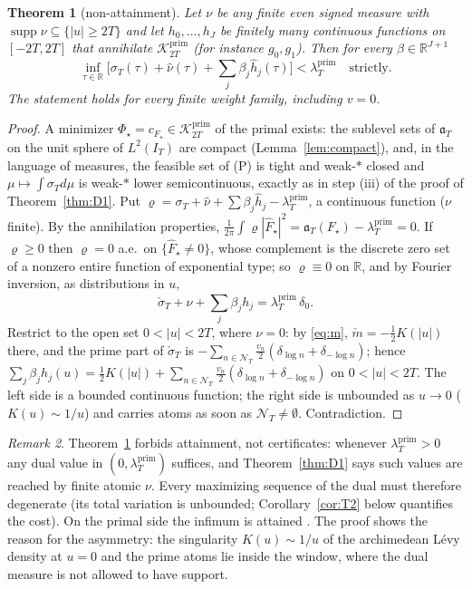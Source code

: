 \documentclass[11pt]{amsart}
\newtheorem{theorem}{Theorem}[section]
\theoremstyle{definition}
\theoremstyle{remark}
\newtheorem{remark}[theorem]{Remark}
\newcommand{\R}{\mathbb R}
\newcommand{\supp}{\operatorname{supp}}
\newcommand{\Kp}{\mathcal K^{\mathrm{prim}}_{2T}}
\newcommand{\IT}{I_T}
\newcommand{\lamP}{\lambda^{\mathrm{prim}}_T}
\newcommand{\sT}{\sigma_T}
\newcommand{\nuh}{\widehat\nu}
\newcommand{\Fh}{\widehat F}
\newcommand{\NT}{\mathcal N_T}
\begin{document}
\begin{theorem}[non-attainment]\label{thm:O}
Let $\nu$ be any finite even signed measure with $\supp\nu\subseteq\{|u|\ge2T\}$ and let
$h_0,\dots,h_J$ be finitely many continuous functions on $[-2T,2T]$ that annihilate $\Kp$
(for instance $g_0,g_1$). Then for every $\beta\in\R^{J+1}$
\[
\inf_{\tau\in\R}\Big[\sT(\tau)+\nuh(\tau)+\sum_j\beta_j\widehat h_j(\tau)\Big]<\lamP\quad\text{strictly.}
\]
The statement holds for every finite weight family, including $v=0$.
\end{theorem}
\begin{proof}
A minimizer $\Phi_\star=c_{F_\star}\in\Kp$ of the primal exists: the sublevel sets of
$\mathfrak a_T$ on the unit sphere of $L^2(\IT)$ are compact (Lemma~\ref{lem:compact}),
and, in the language of measures, the feasible set of (P) is tight and weak-$*$ closed and $\mu\mapsto\int\sT d\mu$ is
weak-$*$ lower semicontinuous, exactly as in step (iii) of the proof of Theorem~\ref{thm:D1}. Put $\varrho=\sT+\nuh+\sum\beta_j\widehat h_j-\lamP$, a
continuous function ($\nu$ finite). By the annihilation properties,
$\frac1{2\pi}\int\varrho|\Fh_\star|^2=\mathfrak a_T(F_\star)-\lamP=0$. If $\varrho\ge0$ then $\varrho=0$ a.e.\ on
$\{\Fh_\star\ne0\}$, whose complement is the discrete zero set of a nonzero entire function of
exponential type; so $\varrho\equiv0$ on $\R$, and by Fourier inversion, as distributions in $u$,
\[
\check\sT+\nu+\sum_j\beta_jh_j=\lamP\,\delta_0 .
\]
Restrict to the open set $0<|u|<2T$, where $\nu=0$: by \eqref{eq:m}, $\check m=-\frac12K(|u|)$
there, and the prime part of $\check\sT$ is $-\sum_{n\in\NT}\frac{v_n}2(\delta_{\log n}+\delta_{-\log n})$;
hence $\sum_j\beta_jh_j(u)=\frac12K(|u|)+\sum_{n\in\NT}\frac{v_n}2(\delta_{\log n}+\delta_{-\log n})$
on $0<|u|<2T$. The left side is a bounded continuous function; the right side is unbounded as
$u\to0$ ($K(u)\sim1/u$) and carries atoms as soon as $\NT\neq\emptyset$. Contradiction.
\end{proof}

\begin{remark}\label{rem:OvsB}
Theorem~\ref{thm:O} forbids attainment, not certificates: whenever $\lamP>0$ any dual value in
$(0,\lamP)$ suffices, and Theorem~\ref{thm:D1} says such values are reached by finite atomic
$\nu$. Every maximizing sequence of the dual must therefore degenerate (its total variation is
unbounded; Corollary~\ref{cor:T2} below quantifies the cost). On the primal side the infimum is
attained \cite[Thm.~3]{Bombieri2000}. The proof shows the reason for the asymmetry: the
singularity $K(u)\sim1/u$ of the archimedean L\'evy density at $u=0$ and the prime atoms lie inside
the window, where the dual measure is not allowed to have support.
\end{remark}
\end{document}
